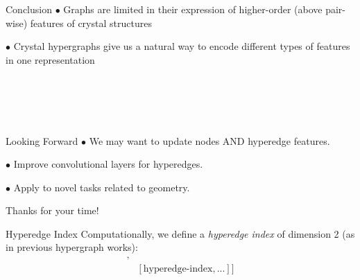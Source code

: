 \documentclass[11pt]{beamer}
\begin{document}
\begin{frame}{Conclusion}
$\bullet$ Graphs are limited in their expression of higher-order (above pair-wise) features of crystal structures

\vspace{.5cm}\pause

$\bullet$ Crystal hypergraphs give us a natural way to encode different types of features in one representation
\end{frame}

\section{$\ $}

\begin{frame}{Looking Forward}
$\bullet$ We may want to update nodes AND hyperedge features.

\vspace{0.5cm}\pause

$\bullet$ Improve convolutional layers for hyperedges.

\vspace{0.5cm}\pause

$\bullet$ Apply to novel tasks related to geometry.

\end{frame}

\begin{frame}
\begin{center}\large
Thanks for your time!
\end{center}

\end{frame}


\begin{frame}{Hyperedge Index}
Computationally, we define a \textit{hyperedge index} of dimension 2 (as in previous hypergraph works):
\begin{align*}
[&[\text{node-index},...],\\
&[\text{hyperedge-index},...]]
\end{align*}
\end{frame}
\end{document}
